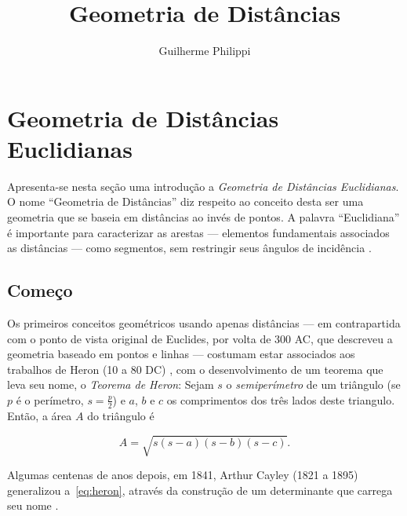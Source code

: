 \documentclass[a4paper,12pt]{article}
\title{Geometria de Distâncias}
\author{Guilherme Philippi}
\begin{document}
\maketitle
\tableofcontents

\section{Geometria de Distâncias Euclidianas}
Apresenta-se nesta seção uma introdução a \textit{Geometria de Distâncias Euclidianas}. O nome ``Geometria de Distâncias'' diz respeito ao conceito desta ser uma geometria que se baseia em distâncias ao invés de pontos. A palavra ``Euclidiana'' é importante para caracterizar as arestas --- elementos fundamentais associados as distâncias --- como segmentos, sem restringir seus ângulos de incidência \cite{libertiEDG}.

\subsection{Começo}

Os primeiros conceitos geométricos usando apenas distâncias --- em contrapartida com o ponto de vista original de Euclides, por volta de 300 AC, que descreveu a geometria baseado em pontos e linhas \cite{elementosEuclides} --- costumam estar associados aos trabalhos de Heron (10 a 80 DC) \cite{libertiEDG}, com o desenvolvimento de um teorema que leva seu nome, o \textit{Teorema de Heron}: Sejam $s$ o \textit{semiperímetro} de um triângulo (se $p$ é o perímetro, $s = \frac{p}{2}$) e $a$, $b$ e $c$ os comprimentos dos três lados deste triangulo. Então, a área $A$ do triângulo é

\begin{equation}\tag{Fórmula de Heron}
A = \sqrt{s(s-a)(s-b)(s-c)}.
\label{eq:heron}
\end{equation}

Algumas centenas de anos depois, em 1841, Arthur Cayley (1821 a 1895) generalizou a~\ref{eq:heron}, através da construção de um determinante que carrega seu nome \cite{cayley1841HaronGD}.

{}



\end{document}
